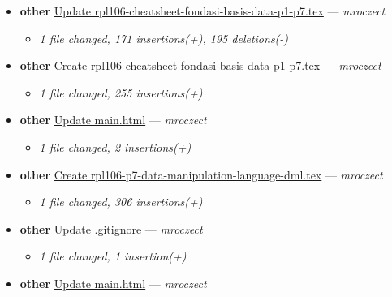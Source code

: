 \begin{itemize}[leftmargin=1.5em]
\begin{itemize}[leftmargin=1.5em]
    \item \small\textit{1 file changed, 165 insertions(+)}
  \end{itemize}
  \item \textbf{other} \href{https://github.com/mroczect/mroczect.github.io/commit/edb6882fae95375b6bda6eb0dc8d6a645ca28290}{Update rpl106-cheatsheet-fondasi-basis-data-p1-p7.tex} --- \textit{mroczect}
  \begin{itemize}[leftmargin=1.5em]
    \item \small\textit{1 file changed, 171 insertions(+), 195 deletions(-)}
  \end{itemize}
  \item \textbf{other} \href{https://github.com/mroczect/mroczect.github.io/commit/8dfcd606b392d1a9eddf93918a46be6cdbfba1a6}{Create rpl106-cheatsheet-fondasi-basis-data-p1-p7.tex} --- \textit{mroczect}
  \begin{itemize}[leftmargin=1.5em]
    \item \small\textit{1 file changed, 255 insertions(+)}
  \end{itemize}
  \item \textbf{other} \href{https://github.com/mroczect/mroczect.github.io/commit/7b02c8a7c8419aea2ed151c5984e58e0a54fbae4}{Update main.html} --- \textit{mroczect}
  \begin{itemize}[leftmargin=1.5em]
    \item \small\textit{1 file changed, 2 insertions(+)}
  \end{itemize}
  \item \textbf{other} \href{https://github.com/mroczect/mroczect.github.io/commit/f33dbbb9e35e603c2b96b78308e4060c5dc531cb}{Create rpl106-p7-data-manipulation-language-dml.tex} --- \textit{mroczect}
  \begin{itemize}[leftmargin=1.5em]
    \item \small\textit{1 file changed, 306 insertions(+)}
  \end{itemize}
  \item \textbf{other} \href{https://github.com/mroczect/mroczect.github.io/commit/6175810fce802660a68a191c0769980e9dd54ed4}{Update .gitignore} --- \textit{mroczect}
  \begin{itemize}[leftmargin=1.5em]
    \item \small\textit{1 file changed, 1 insertion(+)}
  \end{itemize}
  \item \textbf{other} \href{https://github.com/mroczect/mroczect.github.io/commit/5bf9a32ccda6d5d1dda5f4f2631a809695cf1efe}{Update main.html} --- \textit{mroczect}

\end{itemize}
